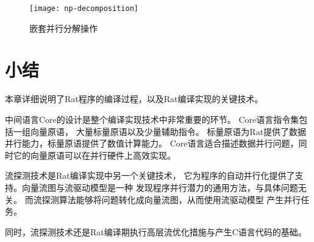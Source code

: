\begin{quotation}
\end{quotation}
\begin{figure}
  \centering
  \texttt{[image: np-decomposition]}
  \caption{嵌套并行分解操作}
  \label{fig:np-decomposition}
\end{figure}

\section{小结}
本章详细说明了Rat程序的编译过程，以及Rat编译实现的关键技术。

中间语言Core的设计是整个编译实现技术中非常重要的环节。
Core语言指令集包括一组向量原语，
大量标量原语以及少量辅助指令。
标量原语为Rat提供了数据并行能力，标量原语提供了数值计算能力。
Core语言适合描述数据并行问题，同时它的向量原语可以在并行硬件上高效实现。

流探测技术是Rat编译实现中另一个关键技术，
它为程序的自动并行化提供了支持。向量流图与流驱动模型是一种
发现程序并行潜力的通用方法，与具体问题无关。
而流探测算法能够将问题转化成向量流图，从而使用流驱动模型
产生并行任务。

同时，流探测技术还是Rat编译期执行高层流优化措施与产生C语言代码的基础。

